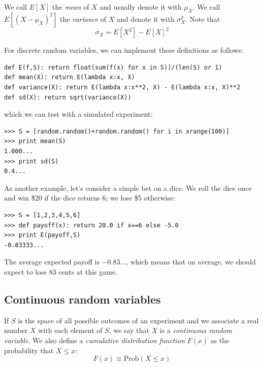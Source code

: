 \documentclass[justified,sixbynine]{tufte-book}
\def\ft{\small\tt}
\theoremstyle{plain}%
\theoremstyle{definition}
\theoremstyle{remark}
\begin{document}
\begin{fullwidth}
We call $E[X]$ the {\it mean} of $X$ and usually denote it with $\mu _X$.
We call $E[(X-\mu _X)^2]$ the {\it variance} of $X$ and denote it with $\sigma _X^2$. Note that
\begin{equation}
\sigma _X=E[X^2]-E[X]^2
\end{equation}

For discrete random variables, we can implement these definitions as follows:

\begin{lstlisting}[caption={in file: {\ft nlib.py}}]
def E(f,S): return float(sum(f(x) for x in S))/(len(S) or 1)
def mean(X): return E(lambda x:x, X)
def variance(X): return E(lambda x:x**2, X) - E(lambda x:x, X)**2
def sd(X): return sqrt(variance(X))
\end{lstlisting}

which we can test with a simulated experiment:

\begin{lstlisting}[caption={in file: {\ft nlib.py}}]
>>> S = [random.random()+random.random() for i in xrange(100)]
>>> print mean(S)
1.000...
>>> print sd(S)
0.4...
\end{lstlisting}

As another example, let's consider a simple bet on a dice. We roll the dice once and win \$20 if the dice returns 6; we lose \$5 otherwise:

\begin{lstlisting}[caption={in file: {\ft nlib.py}}]
>>> S = [1,2,3,4,5,6]
>>> def payoff(x): return 20.0 if x==6 else -5.0
>>> print E(payoff,S)
-0.83333...
\end{lstlisting}

The average expected payoff is $-0.83\dots$, which means that on average, we should expect to lose 83 cents at this game.

\goodbreak\subsection{Continuous random variables}

If $S$ is the space of all possible outcomes of an experiment and we
associate a real number $X$ with each element of $S$, we say that $X$ is a {\it %
continuous random variable}. We also define a {\it cumulative distribution
function} $F(x)$ as the probability that $X\leq x$:
\begin{equation}
F(x)\equiv \textrm{Prob}(X\leq x)
\end{equation}


\end{fullwidth}
\end{document}
